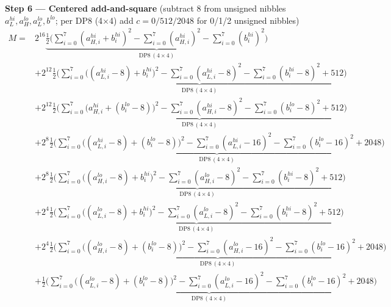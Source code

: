 \documentclass[fleqn]{article}
\newcommand{\DPop}[3]{\mathrm{DP#1}\,(#2\!\times\!#3)}
\begin{document}
\textbf{Step 6 --- Centered add-and-square}\quad
{\small(subtract $8$ from unsigned nibbles $a_L^{hi},a_H^{lo},a_L^{lo},b^{lo}$; per DP8 (4$\times$4) add $c=0/512/2048$ for 0/1/2 unsigned nibbles)}
{\small
\begin{align*}
M = {}
  & 2^{16}\underbrace{\tfrac12\Big(\sum_{i=0}^{7}(a_{H,i}^{hi}{+}b_i^{hi})^2 - \sum_{i=0}^{7}(a_{H,i}^{hi})^2 - \sum_{i=0}^{7}(b_i^{hi})^2\Big)}_{\DPop{8}{4}{4}} \\[0.15em]
  & + 2^{12}\underbrace{\tfrac12\Big(\sum_{i=0}^{7}\big((a_{L,i}^{hi}{-}8){+}b_i^{hi}\big)^2 - \sum_{i=0}^{7}(a_{L,i}^{hi}{-}8)^2 - \sum_{i=0}^{7}(b_i^{hi}{-}8)^2 + 512\Big)}_{\DPop{8}{4}{4}} \\[0.15em]
  & + 2^{12}\underbrace{\tfrac12\Big(\sum_{i=0}^{7}\big(a_{H,i}^{hi}{+}(b_i^{lo}{-}8)\big)^2 - \sum_{i=0}^{7}(a_{H,i}^{hi}{-}8)^2 - \sum_{i=0}^{7}(b_i^{lo}{-}8)^2 + 512\Big)}_{\DPop{8}{4}{4}} \\[0.15em]
  & + 2^{8}\underbrace{\tfrac12\Big(\sum_{i=0}^{7}\big((a_{L,i}^{hi}{-}8){+}(b_i^{lo}{-}8)\big)^2 - \sum_{i=0}^{7}(a_{L,i}^{hi}{-}16)^2 - \sum_{i=0}^{7}(b_i^{lo}{-}16)^2 + 2048\Big)}_{\DPop{8}{4}{4}} \\[0.15em]
  & + 2^{8}\underbrace{\tfrac12\Big(\sum_{i=0}^{7}\big((a_{H,i}^{lo}{-}8){+}b_i^{hi}\big)^2 - \sum_{i=0}^{7}(a_{H,i}^{lo}{-}8)^2 - \sum_{i=0}^{7}(b_i^{hi}{-}8)^2 + 512\Big)}_{\DPop{8}{4}{4}} \\[0.15em]
  & + 2^{4}\underbrace{\tfrac12\Big(\sum_{i=0}^{7}\big((a_{L,i}^{lo}{-}8){+}b_i^{hi}\big)^2 - \sum_{i=0}^{7}(a_{L,i}^{lo}{-}8)^2 - \sum_{i=0}^{7}(b_i^{hi}{-}8)^2 + 512\Big)}_{\DPop{8}{4}{4}} \\[0.15em]
  & + 2^{4}\underbrace{\tfrac12\Big(\sum_{i=0}^{7}\big((a_{H,i}^{lo}{-}8){+}(b_i^{lo}{-}8)\big)^2 - \sum_{i=0}^{7}(a_{H,i}^{lo}{-}16)^2 - \sum_{i=0}^{7}(b_i^{lo}{-}16)^2 + 2048\Big)}_{\DPop{8}{4}{4}} \\[0.15em]
  & + \underbrace{\tfrac12\Big(\sum_{i=0}^{7}\big((a_{L,i}^{lo}{-}8){+}(b_i^{lo}{-}8)\big)^2 - \sum_{i=0}^{7}(a_{L,i}^{lo}{-}16)^2 - \sum_{i=0}^{7}(b_i^{lo}{-}16)^2 + 2048\Big)}_{\DPop{8}{4}{4}}
\end{align*}
}
\end{document}
